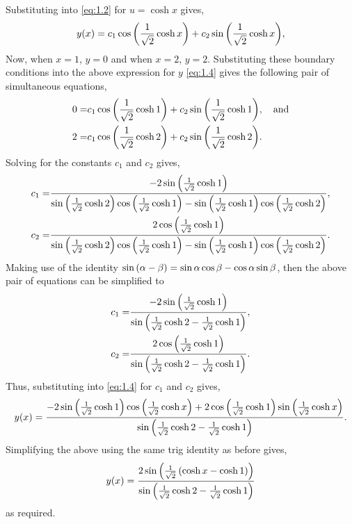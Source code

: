 \def\osx[#1]{{\L\frac{1}{\sqrt{2}}\cosh {#1}\R}}%
\def\os2{\frac{1}{\sqrt{2}}}%
Substituting into \eqref{eq:1.2} for $u=\cosh x$ gives,
\begin{equation}
\label{eq:1.4}
	y(x) = c_1\cos\osx[x] + c_2\sin\osx[x],
\end{equation}
Now, when $x=1$, $y=0$ and when $x=2$, $y=2$. Substituting  these boundary conditions into the above expression for $y$ \eqref{eq:1.4} gives the following pair of simultaneous equations,
\begin{align*}
	0 =& c_1\cos\osx[1] + c_2\sin\osx[1],\quad\textrm{and}\\
	2 =& c_1\cos\osx[2] + c_2\sin\osx[2].
\end{align*}
Solving for the constants $c_1$ and $c_2$ gives,
\begin{align*}
	c_1 =&\frac{
				-2\sin\osx[1]
		      }
		      {
		      	\sin\osx[2]\cos\osx[1]-\sin\osx[1]\cos\osx[2]
		      },\\
	c_2 =&\frac{
				2\cos\osx[1]
		      }
		      {
		      	\sin\osx[2]\cos\osx[1]-\sin\osx[1]\cos\osx[2]
		      }.      
\end{align*}
Making use of the identity $\sin\left(\alpha-\beta\right) = \sin\alpha\cos\beta -\cos\alpha\sin\beta$, then the above pair of equations can be simplified to
\begin{align*}
	c_1 =&\frac{
				-2\sin\osx[1]
		      }
		      {
		      	\sin \L \os2 \cosh 2 - \os2 \cosh 1\R
		      },\\
	c_2 =&\frac{
				2\cos\osx[1]
		      }
		      {
		      	\sin \L \os2 \cosh 2 - \os2 \cosh 1\R
		      }.      
\end{align*}
Thus, substituting into \eqref{eq:1.4} for $c_1$ and $c_2$ gives,
\[
	y(x) = \frac{
				-2\sin\osx[1]\cos\osx[x] + 2\cos\osx[1]\sin\osx[x]
			}
			{
				\sin \L \os2 \cosh 2 - \os2 \cosh 1\R
			}.
\]
Simplifying the above using the same trig identity as before gives,
\[
	y(x) = \frac{
				2\sin\L\os2\L\cosh x - \cosh 1\R \R
			}
			{
				\sin \L \os2 \cosh 2 - \os2 \cosh 1\R
			}
\]
as required.